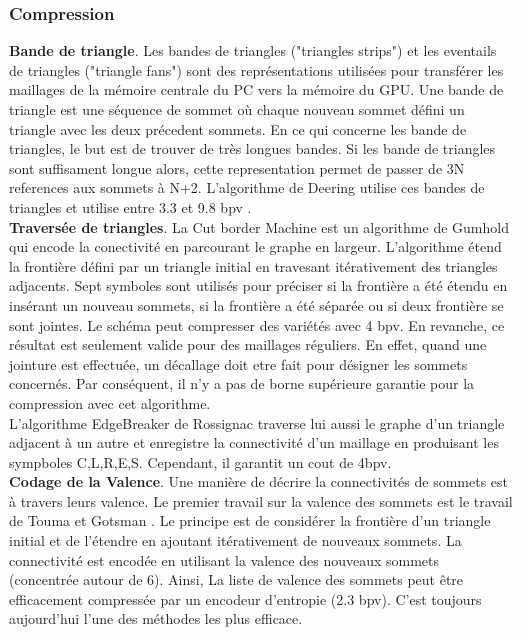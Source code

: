 \subsubsection{Compression}
\noindent
\textbf{Bande de triangle}. Les bandes de triangles ("triangles strips") et les eventails de triangles ("triangle fans") sont des représentations utilisées pour transférer les maillages de la mémoire centrale du PC vers la mémoire du GPU. Une bande de triangle est une séquence de sommet où chaque nouveau sommet défini un triangle avec les deux précedent sommets. En ce qui concerne les bande de triangles, le but est de trouver de très longues bandes. Si les bande de triangles sont suffisament longue alors, cette representation permet de passer de 3N references aux sommets à N+2. L'algorithme de Deering utilise ces bandes de triangles et utilise entre 3.3 et 9.8 bpv \cite{triangle_strips}.\\
\textbf{Traversée de triangles}. La Cut border Machine \cite{cut_border_machine_2d} est un algorithme de Gumhold qui encode la conectivité en parcourant le graphe en largeur. L'algorithme étend la frontière défini par un triangle initial en travesant itérativement des triangles adjacents. Sept symboles sont utilisés pour préciser si la frontière a été étendu en insérant un nouveau sommets, si la frontière a été séparée ou si deux frontière se sont jointes. Le schéma peut compresser des variétés avec 4 bpv. En revanche, ce résultat est seulement valide pour des maillages réguliers. En effet, quand une jointure est effectuée, un décallage doit etre fait pour désigner les sommets concernés. Par conséquent, il n'y a pas de borne supérieure garantie pour la compression avec cet algorithme.\\
L'algorithme EdgeBreaker de Rossignac \cite{edgebreaker} traverse lui aussi le graphe d'un triangle adjacent à un autre et enregistre la connectivité d'un maillage en produisant les sympboles C,L,R,E,S. Cependant, il garantit un cout de 4bpv.\\
\textbf{Codage de la Valence}. Une manière de décrire la connectivités de sommets est à travers leurs valence. Le premier travail sur la valence des sommets est le travail de Touma et Gotsman \cite{valence_encoding}. Le principe est de considérer la frontière d'un triangle initial et de l'étendre en ajoutant itérativement de nouveaux sommets. La connectivité est encodée en utilisant la valence des nouveaux sommets (concentrée autour de 6). Ainsi, La liste de valence des sommets peut être efficacement compressée par un encodeur d'entropie (2.3 bpv). C'est toujours aujourd'hui l'une des méthodes les plus efficace.

